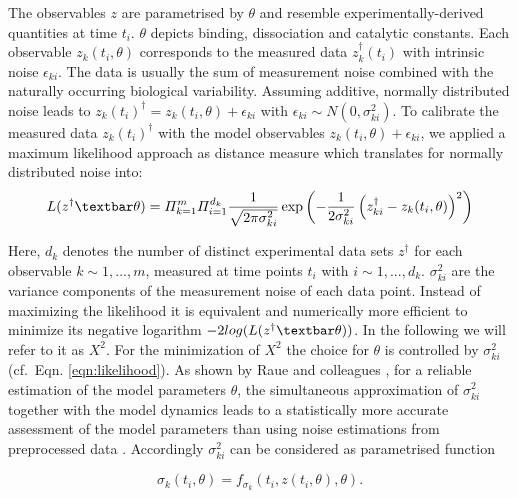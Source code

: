 The observables $z$ are parametrised by $\theta$ and resemble experimentally-derived quantities at time $t_i$. $\theta$ depicts binding, dissociation and catalytic constants. Each observable $z_k(t_i,\theta)$ corresponds to the measured data $z_k^\dag(t_i)$ with intrinsic noise $\epsilon_{ki}$. The data is usually the sum of measurement noise combined with the naturally occurring biological variability. Assuming additive, normally distributed noise leads to $z_k(t_i)^\dag = z_k(t_i,\theta) + \epsilon_{ki}$ with $\epsilon_{ki} \sim N(0,\sigma_{ki}^2)$. To calibrate the measured data $z_k(t_i)^\dag$ with the model observables $z_k(t_i,\theta)+\epsilon_{ki}$, we applied a maximum likelihood approach as distance measure which translates for normally distributed noise into:
\begin{equation}
\label{eqn:likelihood}
L(z^\dag \textbar \theta) = \varPi_{k=1}^m \varPi_{i=1}^{d_k} \frac{1}{\sqrt{2\pi \sigma_{ki}^2}}\exp \left( -\frac{1}{2\sigma_{ki}^2}\left(z_{ki}^\dag - z_k(t_i,\theta)\right)^2\right)
\end{equation}
  
Here, $d_k$ denotes the number of distinct experimental data sets $z^\dag$ for each observable $k\sim 1,...,m$, measured at time points $t_i$ with $i\sim 1,...,d_k$. $\sigma_{ki}^2$ are the variance components of the measurement noise of each data point. Instead of maximizing the likelihood it is equivalent and numerically more efficient to minimize its negative logarithm $-2log(L(z^\dag\textbar\theta))$. In the following we will refer to it as $X^2$.  For the minimization of $X^2$ the choice for $\theta$ is controlled by $\sigma_{ki}^2$ (cf.\ Eqn. \ref{eqn:likelihood}). As shown by Raue and colleagues \cite{Raue2013}, for a reliable estimation of the model parameters $\theta$, the simultaneous approximation of $\sigma_{ki}^2$ together with the model dynamics leads to a statistically more accurate assessment of the model parameters than using noise estimations from preprocessed data \cite{Raue2013}. Accordingly $\sigma_{ki}^2$ can be considered as parametrised function

\begin{equation}
\sigma_{k}(t_i,\theta) = f_{\sigma_{k}}(t_i,z(t_i,\theta),\theta).
\end{equation}    

